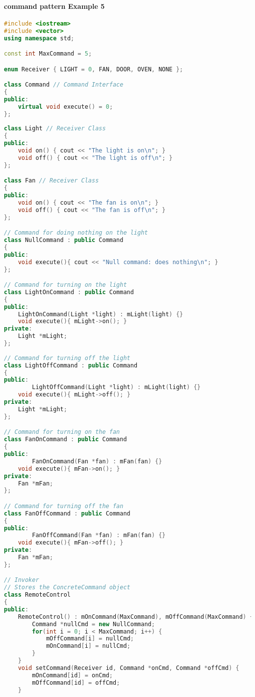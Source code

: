 \documentclass{book}
\begin{document}
\paragraph{command pattern Example 5}\mbox{}
\begin{lstlisting}[caption={Command pattern sample code 5, commandexample.cpp},label={lst:cm6},language=C++]
#include <iostream>
#include <vector>
using namespace std;

const int MaxCommand = 5;

enum Receiver { LIGHT = 0, FAN, DOOR, OVEN, NONE }; 

class Command // Command Interface
{
public:
	virtual void execute() = 0;
};
 
class Light // Receiver Class
{
public:
	void on() { cout << "The light is on\n"; }
	void off() { cout << "The light is off\n"; }
}; 

class Fan // Receiver Class
{
public:
	void on() { cout << "The fan is on\n"; }
	void off() { cout << "The fan is off\n"; }
}; 

// Command for doing nothing on the light
class NullCommand : public Command 
{
public:
	void execute(){ cout << "Null command: does nothing\n"; }
};

// Command for turning on the light
class LightOnCommand : public Command 
{
public:
    LightOnCommand(Light *light) : mLight(light) {}
	void execute(){ mLight->on(); }
private:
	Light *mLight;
};
 
// Command for turning off the light
class LightOffCommand : public Command 
{
public:
        LightOffCommand(Light *light) : mLight(light) {}
	void execute(){ mLight->off(); }
private:
	Light *mLight;
};

// Command for turning on the fan
class FanOnCommand : public Command 
{
public:
        FanOnCommand(Fan *fan) : mFan(fan) {}
	void execute(){ mFan->on(); }
private:
	Fan *mFan;
};

// Command for turning off the fan
class FanOffCommand : public Command 
{
public:
        FanOffCommand(Fan *fan) : mFan(fan) {}
	void execute(){ mFan->off(); }
private:
	Fan *mFan;
};

// Invoker 
// Stores the ConcreteCommand object 
class RemoteControl 
{
public:
	RemoteControl() : mOnCommand(MaxCommand), mOffCommand(MaxCommand) {
		Command *nullCmd = new NullCommand;
		for(int i = 0; i < MaxCommand; i++) {
			mOffCommand[i] = nullCmd;
			mOnCommand[i] = nullCmd;
		}
	}
	void setCommand(Receiver id, Command *onCmd, Command *offCmd) {
		mOnCommand[id] = onCmd;
		mOffCommand[id] = offCmd;
	}


\end{lstlisting}
\end{document}
